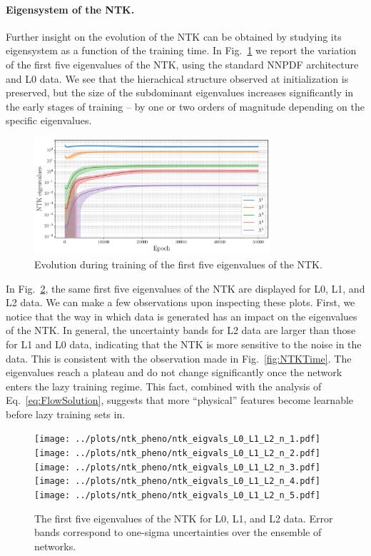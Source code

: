 \paragraph{Eigensystem of the NTK.}
Further insight on the evolution of the NTK can be obtained by studying its eigensystem as 
a function of the training time. 
In Fig.~\ref{fig:EigvalL0Training} we report the variation of the first five eigenvalues 
of the NTK, using the standard NNPDF architecture and L0 data. We see that the hierachical
structure observed at initialization is preserved, but the size of the subdominant eigenvalues
increases significantly in the early stages of training -- by one or two orders of magnitude depending on the 
specific eigenvalues. 
\begin{figure}[ht!]
  \centering  
  \includegraphics[width=0.78\textwidth]{plots/ntk_pheno/ntk_eigvals_single_plot_L0.pdf}  
  \caption{Evolution during training of the first five eigenvalues of the NTK.}
  \label{fig:EigvalL0Training}
\end{figure}
In Fig.~\ref{fig:EigvalsComparison}, the same first five eigenvalues of the NTK
are displayed for L0, L1, and L2 data. We can make a few observations upon
inspecting these plots. First, we notice that the way in which data is generated
has an impact on the eigenvalues of the NTK. In general, the uncertainty bands
for L2 data are larger than those for L1 and L0 data, indicating that the NTK is
more sensitive to the noise in the data. This is consistent with the observation
made in Fig.~\ref{fig:NTKTime}. 
The eigenvalues reach a plateau and do not change significantly once 
the network enters the lazy training regime. This fact, combined with the analysis of Eq.~\eqref{eq:FlowSolution}, 
suggests that more ``physical'' features become learnable before lazy training sets in. 

\begin{figure}[ht!]
  \centering
  \texttt{[image: ../plots/ntk\_pheno/ntk\_eigvals\_L0\_L1\_L2\_n\_1.pdf]}
  \texttt{[image: ../plots/ntk\_pheno/ntk\_eigvals\_L0\_L1\_L2\_n\_2.pdf]}
  \texttt{[image: ../plots/ntk\_pheno/ntk\_eigvals\_L0\_L1\_L2\_n\_3.pdf]}
  \texttt{[image: ../plots/ntk\_pheno/ntk\_eigvals\_L0\_L1\_L2\_n\_4.pdf]}
  \texttt{[image: ../plots/ntk\_pheno/ntk\_eigvals\_L0\_L1\_L2\_n\_5.pdf]}
  \vspace{0.5cm}
  \caption{The first five eigenvalues of the NTK for L0, L1, and L2 data. Error
  bands correspond to one-sigma uncertainties over the ensemble of networks.}
  \label{fig:EigvalsComparison}
\end{figure}


